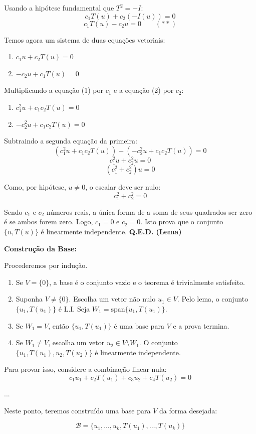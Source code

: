 Usando a hipótese fundamental que $T^2=-I$:
\[
c_1T(u)+c_2(-I(u))=0
\]
\[
c_1T(u)-c_2u=0 \quad\quad (**)
\]

Temos agora um sistema de duas equações vetoriais:
\begin{enumerate}
\item $c_1u+c_2T(u)=0$
\item $-c_2u+c_1T(u)=0$
\end{enumerate}

Multiplicando a equação (1) por $c_1$ e a equação (2) por $c_2$:
\begin{enumerate}
\item $c_1^2u+c_1c_2T(u)=0$
\item $-c_2^2u+c_1c_2T(u)=0$
\end{enumerate}

Subtraindo a segunda equação da primeira:
\[
(c_1^2u+c_1c_2T(u))-( -c_2^2u+c_1c_2T(u))=0
\]
\[
c_1^2u+c_2^2u=0
\]
\[
(c_1^2+c_2^2)u=0
\]

Como, por hipótese, $u\neq 0$, o escalar deve ser nulo:
\[
c_1^2+c_2^2=0
\]

Sendo $c_1$ e $c_2$ números reais, a única forma de a soma de seus quadrados ser zero é se ambos forem
zero. Logo, $c_1=0$ e $c_2=0$.
Isto prova que o conjunto $\{u,T(u)\}$ é linearmente independente. \textbf{Q.E.D. (Lema)}

\textbf{Construção da Base:}

Procederemos por indução.

\begin{enumerate}
\item Se $V=\{0\}$, a base é o conjunto vazio e o teorema é trivialmente satisfeito.
\item Suponha $V\neq \{0\}$. Escolha um vetor não nulo $u_1\in V$. Pelo lema, o conjunto $\{u_1,T(u_1)\}$ é L.I. Seja $W_1=\mathrm{span}\{u_1,T(u_1)\}$.
\item Se $W_1=V$, então $\{u_1,T(u_1)\}$ é uma base para $V$ e a prova termina.
\item Se $W_1\neq V$, escolha um vetor $u_2\in V\setminus W_1$. O conjunto $\{u_1,T(u_1),u_2,T(u_2)\}$ é linearmente independente.
\end{enumerate}

Para provar isso, considere a combinação linear nula:
\[
c_1u_1+c_2T(u_1)+c_3u_2+c_4T(u_2)=0
\]

...

Neste ponto, teremos construído uma base para $V$ da forma desejada:

\[
\mathcal{B}=\{u_1,\ldots,u_k,T(u_1),\ldots,T(u_k)\}
\]

